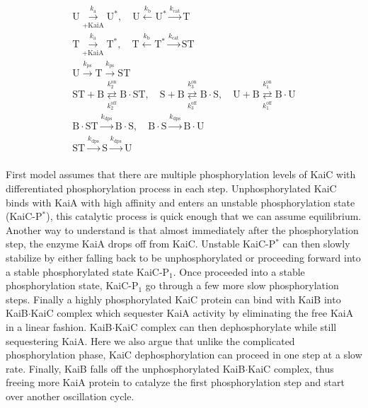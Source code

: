 \documentclass[a4paper,10pt]{article}
\numberwithin{equation}{section}
\begin{document}
\begin{equation}
\begin{gathered}
\mathrm U \overset{k_{\mathrm{a}}}{\underset{+\mathrm {KaiA}}{\longrightarrow}} \mathrm U^{*}, \quad \mathrm U \overset{k_{\mathrm {b}}}{\longleftarrow} \mathrm U^{*} \overset{ k_\mathrm {cat}}{\longrightarrow} \mathrm T 
\\ 
\mathrm T \overset{k_{\mathrm{a}}}{\underset{+\mathrm {KaiA}}{\longrightarrow}} \mathrm T^{*},\quad \mathrm T \overset{k_{\mathrm {b}}}{\longleftarrow} \mathrm T^{*} \overset{ k_\mathrm{cat}}{\longrightarrow} \mathrm{ST} \\
\mathrm{U} \overset{ k_\mathrm{ps}}{\longrightarrow} \mathrm{T} \overset{ k_\mathrm{ps}}{\longrightarrow} \mathrm{ST} \\
\mathrm {ST}+\mathrm B\overset{ k_{2}^{\mathrm{on}}}{\underset{k_{2}^{\mathrm{off}}}{\rightleftarrows}} \mathrm {B\cdot ST},\quad \mathrm S+\mathrm B\overset{ k_{3}^{\mathrm{on}}}{\underset{k_{3}^{\mathrm{off}}}{\rightleftarrows}} \mathrm {B\cdot S},\quad \mathrm U+\mathrm B\overset{ k_{1}^{\mathrm{on}}}{\underset{k_{1}^{\mathrm{off}}}{\rightleftarrows}} \mathrm {B\cdot U}\\
\mathrm {B\cdot ST} \overset{ k_{\mathrm{dps}}}{\longrightarrow} \mathrm{B\cdot S}, \quad
\mathrm {B\cdot S} \overset{ k_{\mathrm{dps}}}{\longrightarrow} \mathrm{B\cdot U}\\
 \mathrm{ST} \overset{ k_\mathrm{dps}}{\longrightarrow} \mathrm{S} \overset{ k_\mathrm{dps}}{\longrightarrow} \mathrm{U} \\
\end{gathered}\label{eq:full}
\end{equation}

First model assumes that there are multiple phosphorylation levels of KaiC with differentiated phosphorylation process in each step. Unphosphorylated KaiC binds with KaiA with high affinity and enters an unstable phosphorylation state (KaiC-P$^{*}$), this catalytic process is quick enough that we can assume equilibrium. Another way to understand is that almost immediately after the phosphorylation step, the enzyme KaiA drops off from KaiC. 
Unstable KaiC-P$^{*}$ can then slowly stabilize by either falling back to be unphosphorylated or proceeding forward into a stable phosphorylated state KaiC-P$_{1}$. Once proceeded into a stable phosphorylation state, KaiC-P$_{1}$ go through a few more slow phosphorylation steps. Finally a highly phosphorylated KaiC protein can bind with KaiB into KaiB$\cdot$KaiC complex which sequester KaiA activity by eliminating the free KaiA in a linear fashion. KaiB$\cdot$KaiC complex can then dephosphorylate while still sequestering KaiA. Here we also argue that unlike the complicated phosphorylation phase, KaiC dephosphorylation can proceed in one step at a slow rate. Finally, KaiB falls off the unphosphorylated KaiB$\cdot$KaiC complex, thus freeing more KaiA protein to catalyze the first phosphorylation step and start over another oscillation cycle. 
\end{document}
